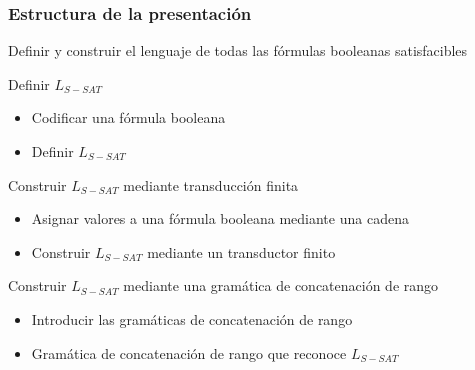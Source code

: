\documentclass{beamer}
\begin{document}
\begin{frame}
    \frametitle{Estructura de la presentación}
    
    Definir y construir el lenguaje de todas las fórmulas booleanas satisfacibles   
    
    
    \begin{block}{Definir $L_{S-SAT}$}
        \begin{itemize}
            \item Codificar una fórmula booleana
            \item Definir $L_{S-SAT}$
        \end{itemize}
    \end{block}
    
    
    \begin{block}{Construir $L_{S-SAT}$ mediante transducción finita}
        \begin{itemize}
            \item Asignar valores a una fórmula booleana mediante una cadena
            \item Construir $L_{S-SAT}$ mediante un transductor finito
        \end{itemize}
    \end{block}
    
    
    \begin{block}{Construir $L_{S-SAT}$ mediante una gramática de concatenación de rango}
        \begin{itemize}
            \item Introducir las gramáticas de concatenación de rango
            \item Gramática de concatenación de rango que reconoce $L_{S-SAT}$
        \end{itemize}
    \end{block}
\end{frame}
\end{document}
